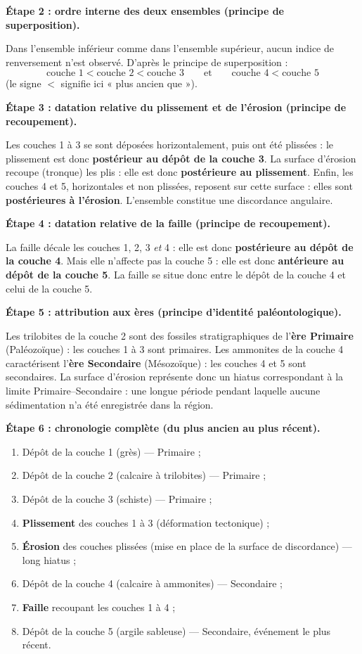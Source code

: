 \documentclass[11pt]{article}
\newcommand{\cle}[1]{{\popxbold\color{popdark}#1}}
\begin{document}
\begin{exoresolu}
\textbf{Étape 2 : ordre interne des deux ensembles (principe de superposition).}

Dans l'ensemble inférieur comme dans l'ensemble supérieur, aucun indice de renversement n'est observé. D'après le \cle{principe de superposition} :
\[ \text{couche 1} < \text{couche 2} < \text{couche 3} \qquad \text{et} \qquad \text{couche 4} < \text{couche 5} \]
(le signe $<$ signifie ici « plus ancien que »).

\textbf{Étape 3 : datation relative du plissement et de l'érosion (principe de recoupement).}

Les couches 1 à 3 se sont déposées horizontalement, puis ont été \cle{plissées} : le plissement est donc \textbf{postérieur au dépôt de la couche 3}. La surface d'érosion recoupe (tronque) les plis : elle est donc \textbf{postérieure au plissement}. Enfin, les couches 4 et 5, horizontales et non plissées, reposent sur cette surface : elles sont \textbf{postérieures à l'érosion}. L'ensemble constitue une \cle{discordance angulaire}.

\textbf{Étape 4 : datation relative de la faille (principe de recoupement).}

La faille décale les couches 1, 2, 3 \emph{et} 4 : elle est donc \textbf{postérieure au dépôt de la couche 4}. Mais elle n'affecte pas la couche 5 : elle est donc \textbf{antérieure au dépôt de la couche 5}. La faille se situe donc entre le dépôt de la couche 4 et celui de la couche 5.

\textbf{Étape 5 : attribution aux ères (principe d'identité paléontologique).}

Les \cle{trilobites} de la couche 2 sont des fossiles stratigraphiques de l'\textbf{ère Primaire} (Paléozoïque) : les couches 1 à 3 sont primaires. Les \cle{ammonites} de la couche 4 caractérisent l'\textbf{ère Secondaire} (Mésozoïque) : les couches 4 et 5 sont secondaires. La surface d'érosion représente donc un \cle{hiatus} correspondant à la limite Primaire--Secondaire : une longue période pendant laquelle aucune sédimentation n'a été enregistrée dans la région.

\textbf{Étape 6 : chronologie complète (du plus ancien au plus récent).}

\begin{enumerate}
\item Dépôt de la couche 1 (grès) — Primaire ;
\item Dépôt de la couche 2 (calcaire à trilobites) — Primaire ;
\item Dépôt de la couche 3 (schiste) — Primaire ;
\item \textbf{Plissement} des couches 1 à 3 (déformation tectonique) ;
\item \textbf{Érosion} des couches plissées (mise en place de la surface de discordance) — long hiatus ;
\item Dépôt de la couche 4 (calcaire à ammonites) — Secondaire ;
\item \textbf{Faille} recoupant les couches 1 à 4 ;
\item Dépôt de la couche 5 (argile sableuse) — Secondaire, événement le plus récent.
\end{enumerate}


\end{exoresolu}
\end{document}
